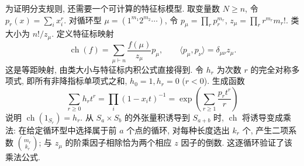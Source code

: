 为证明分支规则, 还需要一个可计算的特征标模型. 取变量数 $N\ge n$, 令 $p_r(x)=\sum_i x_i^r$. 对循环型 $\mu=(1^{m_1}2^{m_2}\cdots)$, 令 $p_\mu=\prod_rp_r^{m_r}$, $z_\mu=\prod_r r^{m_r}m_r!$. 类大小为 $n!/z_\mu$. 定义特征标映射
\[
 \operatorname{ch}(f)=\sum_{\mu\vdash n}\frac{f(\mu)}{z_\mu}p_\mu,
 \qquad \langle p_\mu,p_\nu\rangle=\delta_{\mu\nu}z_\mu.
\]
这是等距映射, 由类大小与特征标内积公式直接得到. 令 $h_r$ 为次数 $r$ 的完全对称多项式, 即所有非降指标单项式之和, $h_0=1,h_r=0$ ($r<0$). 生成函数
\[
 \sum_{r\ge0}h_r t^r=\prod_i(1-x_it)^{-1}
  =\exp\left(\sum_{r\ge1}\frac{p_r t^r}{r}\right)
\]
说明 $\operatorname{ch}(1_{S_r})=h_r$. 从 $S_a\times S_b$ 的外张量积诱导到 $S_{a+b}$ 时, $\operatorname{ch}$ 将诱导变成乘法: 在给定循环型中选择属于前 $a$ 个点的循环, 对每种长度选出 $k_r$ 个, 产生二项系数 $\binom{m_r}{k_r}$; 与 $z_\mu$ 的阶乘因子相除恰为两个相应 $z$ 因子的倒数. 这逐循环验证了该乘法公式.

